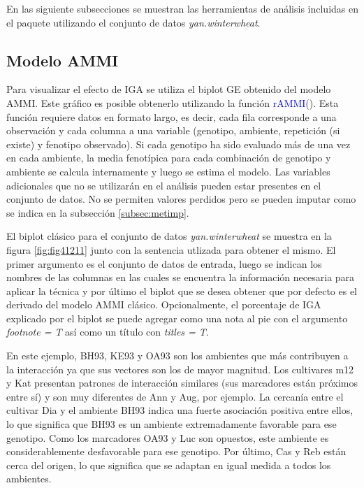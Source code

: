   
En las siguiente subsecciones se muestran las herramientas de análisis incluidas en el paquete utilizando el conjunto de datos \emph{yan.winterwheat}.  
  
\subsection{Modelo AMMI}

Para visualizar el efecto de IGA se utiliza el biplot GE obtenido del modelo AMMI. Este gráfico es posible obtenerlo utilizando la función \textcolor{blue}{rAMMI}(). Esta función requiere datos en formato largo, es decir, cada fila corresponde a una observación y cada columna a una variable (genotipo, ambiente, repetición (si existe) y fenotipo observado). Si cada genotipo ha sido evaluado más de una vez en cada ambiente, la media fenotípica para cada combinación de genotipo y ambiente se calcula internamente y luego se estima el modelo. Las variables adicionales que no se utilizarán en el análisis pueden estar presentes en el conjunto de datos. No se permiten valores perdidos pero se pueden imputar como se indica en la subsección \ref{subsec:metimp}. 

El biplot clásico para el conjunto de datos \emph{yan.winterwheat} se muestra en la figura \ref{fig:fig41211} junto con la sentencia utlizada para obtener el mismo. El primer argumento es el conjunto de datos de entrada, luego se indican los nombres de las columnas en las cuales se encuentra la información necesaria para aplicar la técnica y por último el biplot que se desea obtener que por defecto es el derivado del modelo AMMI clásico. Opcionalmente, el porcentaje de IGA explicado por el biplot se puede agregar como una nota al pie con el argumento \emph{footnote = T} así como un título con \emph{titles = T}. 

En este ejemplo, BH93, KE93 y OA93 son los ambientes que más contribuyen a la interacción ya que sus vectores son los de mayor magnitud. Los cultivares m12 y Kat presentan patrones de interacción similares (sus marcadores están próximos entre sí) y son muy diferentes de Ann y Aug, por ejemplo. La cercanía entre el cultivar Dia y el ambiente BH93 indica una fuerte asociación positiva entre ellos, lo que significa que BH93 es un ambiente extremadamente favorable para ese genotipo. Como los marcadores OA93 y Luc son opuestos, este ambiente es considerablemente desfavorable para ese genotipo. Por último, Cas y Reb están cerca del origen, lo que significa que se adaptan en igual medida a todos los ambientes.


